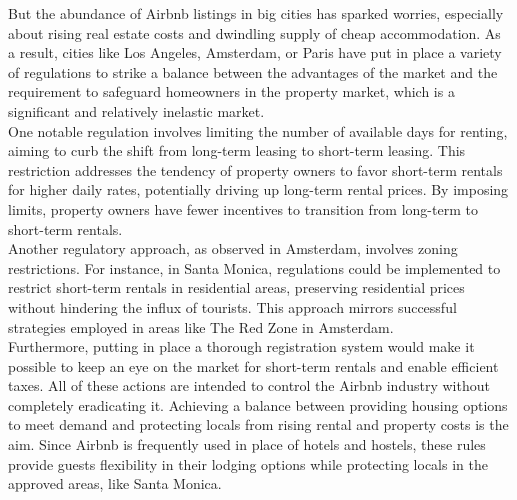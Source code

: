 But the abundance of Airbnb listings in big cities has sparked worries, especially about rising real estate costs and dwindling supply of cheap accommodation. As a result, cities like Los Angeles, Amsterdam, or Paris have put in place a variety of regulations to strike a balance between the advantages of the market and the requirement to safeguard homeowners in the property market, which is a significant and relatively inelastic market.\\

One notable regulation involves limiting the number of available days for renting, aiming to curb the shift from long-term leasing to short-term leasing. This restriction addresses the tendency of property owners to favor short-term rentals for higher daily rates, potentially driving up long-term rental prices. By imposing limits, property owners have fewer incentives to transition from long-term to short-term rentals.\\

Another regulatory approach, as observed in Amsterdam, involves zoning restrictions. For instance, in Santa Monica, regulations could be implemented to restrict short-term rentals in residential areas, preserving residential prices without hindering the influx of tourists. This approach mirrors successful strategies employed in areas like The Red Zone in Amsterdam.\\

Furthermore, putting in place a thorough registration system would make it possible to keep an eye on the market for short-term rentals and enable efficient taxes. All of these actions are intended to control the Airbnb industry without completely eradicating it. Achieving a balance between providing housing options to meet demand and protecting locals from rising rental and property costs is the aim. Since Airbnb is frequently used in place of hotels and hostels, these rules provide guests flexibility in their lodging options while protecting locals in the approved areas, like Santa Monica.\\
